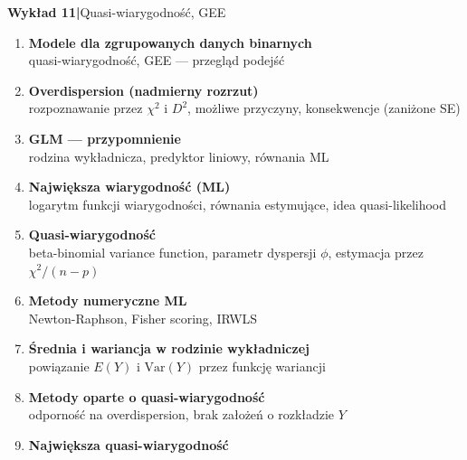 \documentclass[a4paper,11pt]{article}
\begin{document}
\begin{mdframed}[
  backgroundcolor=lightblue,
  linecolor=borderblue,
  linewidth=0.8pt,
  innerleftmargin=10pt,
  innerrightmargin=10pt,
  innertopmargin=6pt,
  innerbottommargin=6pt,
  roundcorner=4pt
]
  \textbf{\color{accentblue}Wykład 11\quad|\quad}{\color{darkgray}Quasi-wiarygodność, GEE}
\end{mdframed}
 
\vspace{0.4em}
\begin{enumerate}[label=\textbf{\arabic*.}, leftmargin=1.8em, itemsep=3pt, topsep=2pt]
  \item \textbf{Modele dla zgrupowanych danych binarnych}\\
        {\small\color{medgray}quasi-wiarygodność, GEE --- przegląd podejść}
  \item \textbf{Overdispersion (nadmierny rozrzut)}\\
        {\small\color{medgray}rozpoznawanie przez $\chi^2$ i $D^2$, możliwe przyczyny, konsekwencje (zaniżone SE)}
  \item \textbf{GLM --- przypomnienie}\\
        {\small\color{medgray}rodzina wykładnicza, predyktor liniowy, równania ML}
  \item \textbf{Największa wiarygodność (ML)}\\
        {\small\color{medgray}logarytm funkcji wiarygodności, równania estymujące, idea quasi-likelihood}
  \item \textbf{Quasi-wiarygodność}\\
        {\small\color{medgray}beta-binomial variance function, parametr dyspersji $\phi$, estymacja przez $\chi^2/(n-p)$}
  \item \textbf{Metody numeryczne ML}\\
        {\small\color{medgray}Newton-Raphson, Fisher scoring, IRWLS}
  \item \textbf{Średnia i wariancja w rodzinie wykładniczej}\\
        {\small\color{medgray}powiązanie $E(Y)$ i $\mathrm{Var}(Y)$ przez funkcję wariancji}
  \item \textbf{Metody oparte o quasi-wiarygodność}\\
        {\small\color{medgray}odporność na overdispersion, brak założeń o rozkładzie $Y$}
  \item \textbf{Największa quasi-wiarygodność}\\

\end{enumerate}
\end{document}
